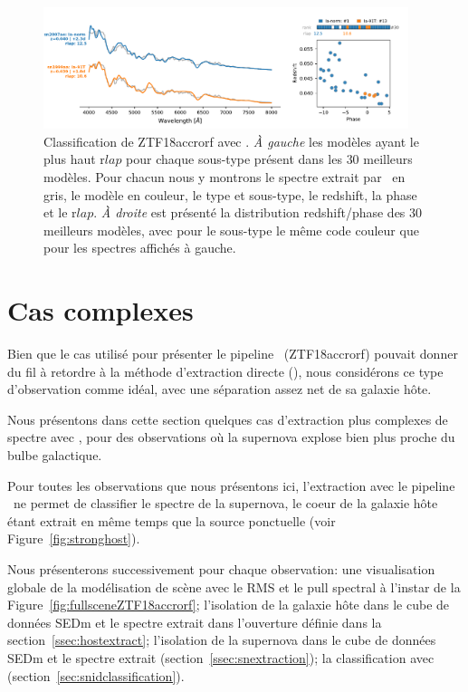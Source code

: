 \documentclass[../main/main.tex]{subfiles}
\begin{document}
\begin{figure}[ht]
  \centering
  \includegraphics[width=0.95\textwidth]{../figures/07_scene/ZTF18accrorf_snid_typing.pdf}
  \caption[Classification de ZTF18accrorf avec
  ]{Classification de ZTF18accrorf avec . \emph{À
      gauche} les modèles ayant le plus haut r$lap$ pour chaque
    sous-type présent dans les $30$ meilleurs modèles. Pour chacun nous
    y montrons le spectre extrait par \hypergal\ en gris, le modèle en couleur, le type et sous-type, le redshift, la phase et
  le r$lap$. \emph{À droite} est présenté la distribution
  redshift/phase des $30$ meilleurs modèles, avec pour le
  sous-type le même code couleur que pour les spectres affichés à gauche.}
  \label{fig:snidZTF18accrorf}
\end{figure}


\section{Cas complexes}

Bien que le cas utilisé pour présenter le pipeline \hypergal\
(ZTF18accrorf) pouvait donner du
fil à retordre à la méthode d'extraction directe (\pysedm), nous
considérons ce type d'observation comme idéal, avec une séparation assez
net de sa galaxie hôte.

Nous présentons dans cette section quelques cas d'extraction plus
complexes de spectre avec \hypergal, pour des observations où la supernova explose
bien plus proche du bulbe galactique.

Pour toutes les observations que nous présentons ici, l'extraction avec le pipeline
\pysedm\ ne permet de classifier le spectre de la supernova, le coeur de
la galaxie hôte étant extrait en même temps que la source ponctuelle
(voir Figure~\ref{fig:stronghost}).

Nous présenterons successivement pour chaque observation: une visualisation globale de la
modélisation de scène avec le RMS et le pull spectral
à l'instar de la Figure~\ref{fig:fullsceneZTF18accrorf}; l'isolation de
la galaxie hôte dans le cube de données SEDm
et le spectre extrait dans l'ouverture définie dans la section~\ref{ssec:hostextract};
l'isolation de la supernova dans le cube de données SEDm et le spectre
extrait (section~\ref{ssec:snextraction}); la
classification avec  (section~\ref{sec:snidclassification}). 
\end{document}

